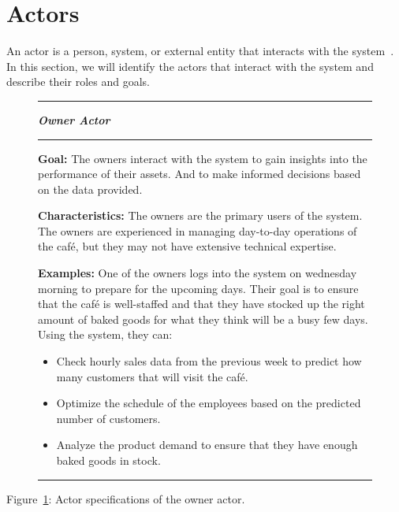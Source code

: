 \section{Actors}\label{sec:actors}
An actor is a person, system, or external entity that interacts with the system~\cite{mathiassen2018}.
In this section, we will identify the actors that interact with the system and describe their roles and goals.

\begin{figure}[H]
    \noindent
    \rule{\textwidth}{0.4pt}
    \begin{center}
    \noindent
    \textit{\textbf{Owner Actor}}
    \end{center}

    \noindent
    \rule{\textwidth}{0.4pt}

    \noindent
    \textbf{Goal:} The owners interact with the system to gain insights into the performance of their assets.
    And to make informed decisions based on the data provided.
    \newline

    \noindent
    \textbf{Characteristics:} The owners are the primary users of the system.
    The owners are experienced in managing day-to-day operations of the café, but they may not have extensive technical
    expertise.
    \newline

    \noindent
    \textbf{Examples:} One of the owners logs into the system on wednesday morning to prepare for the upcoming days.
    Their goal is to ensure that the café is well-staffed and that they have stocked up the right amount of baked goods
    for what they think will be a busy few days.
    Using the system, they can:
    
    \begin{itemize}
        \item Check hourly sales data from the previous week to predict how many customers that will
        visit the café.
        \item Optimize the schedule of the employees based on the predicted number of customers.
        \item Analyze the product demand to ensure that they have enough baked goods in stock.
    \end{itemize}
    \noindent
    \rule{\textwidth}{0.4pt}\label{fig:actor-owner}
\end{figure}

Figure~\ref{fig:actor-owner}: Actor specifications of the owner actor.

